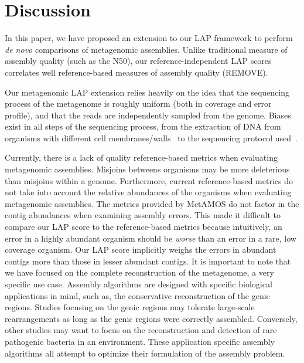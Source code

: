 \documentclass[conference]{IEEEtran}
\begin{document}
\section{Discussion}

In this paper, we have proposed an extension to our LAP framework to perform \emph{de novo} comparisons of metagenomic assemblies.
Unlike traditional measure of assembly quality (such as the N50), our reference-independent LAP scores correlates well reference-based measures of assembly quality (REMOVE).

Our metagenomic LAP extension relies heavily on the idea that the sequencing process of the metagenome is roughly uniform (both in coverage and error profile), and that the reads are independently sampled from the genome.
Biases exist in all steps of the sequencing process, from the extraction of DNA from organisms with different cell membranes/walls~\cite{carrigg2007dna,krsek1999comparison} to the sequencing protocol used~\cite{morgan2010metagenomic,temperton2009bias,darling2004mauve}.

Currently, there is a lack of quality reference-based metrics when evaluating metagenomic assemblies.
Misjoins betweens organisms may be more deleterious than misjoins within a genome.
Furthermore, current reference-based metrics do not take into account the relative abundances of the organisms when evaluating metagenomic assemblies.
The metrics provided by MetAMOS do not factor in the contig abundances when examining assembly errors.
This made it difficult to compare our LAP score to the reference-based metrics because intuitively, an error in a highly abundant organism should be \emph{worse} than an error in a rare, low coverage organism.
Our LAP score implicitly weighs the errors in abundant contigs more than those in lesser abundant contigs.
It is important to note that we have focused on the complete reconstruction of the metagenome, a very specific use case.
Assembly algorithms are designed with specific biological applications in mind, such as, the conservative reconstruction of the genic regions.
Studies focusing on the genic regions may tolerate large-scale rearrangements as long as the genic regions were correctly assembled.
Conversely, other studies may want to focus on the reconstruction and detection of rare pathogenic bacteria in an environment.
These application specific assembly algorithms all attempt to optimize their formulation of the assembly problem.
\end{document}
